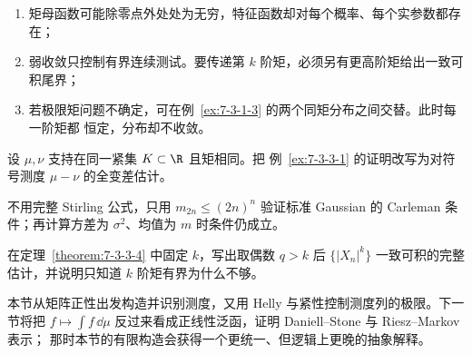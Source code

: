 \begin{remark}[三条不能省略的边界]
\begin{enumerate}
  \item 矩母函数可能除零点外处处为无穷，特征函数却对每个概率、每个实参数都存在；
  \item 弱收敛只控制有界连续测试。要传递第 $k$ 阶矩，必须另有更高阶矩给出一致可积尾界；
  \item 若极限矩问题不确定，可在例~\ref{ex:7-3-1-3} 的两个同矩分布之间交替。此时每一阶矩都
  恒定，分布却不收敛。
\end{enumerate}
\end{remark}

\begin{exercise}
设 $\mu,\nu$ 支持在同一紧集 $K\subset\R$ 且矩相同。把
例~\ref{ex:7-3-3-1} 的证明改写为对符号测度 $\mu-\nu$ 的全变差估计。
\end{exercise}
\begin{exercise}
不用完整 Stirling 公式，只用
$m_{2n}\leq(2n)^n$ 验证标准 Gaussian 的 Carleman 条件；再计算方差为 $\sigma^2$、均值为
$m$ 时条件仍成立。
\end{exercise}
\begin{exercise}
在定理~\ref{theorem:7-3-3-4} 中固定 $k$，写出取偶数 $q>k$ 后
$\{|X_n|^k\}$ 一致可积的完整估计，并说明只知道 $k$ 阶矩有界为什么不够。
\end{exercise}

本节从矩阵正性出发构造并识别测度，又用 Helly 与紧性控制测度列的极限。下一节将把
$f\mapsto\int f\,\dd\mu$ 反过来看成正线性泛函，证明 Daniell--Stone 与 Riesz--Markov 表示；
那时本节的有限构造会获得一个更统一、但逻辑上更晚的抽象解释。
